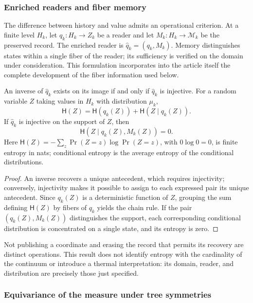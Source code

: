 \subsubsection{Enriched readers and fiber memory}
\label{sec:ch-memoria-fibra}

The difference between history and value admits an operational criterion. At a
finite level \(H_k\), let \(q_k:H_k\to Z_k\) be a reader and let
\(M_k:H_k\to\mathcal M_k\) be the preserved record. The enriched reader
is \(\widehat q_k=(q_k,M_k)\). Memory distinguishes states within a single
fiber of the reader; its sufficiency is verified on the domain under consideration.
This formulation incorporates into the article itself the complete development of the
fiber information used below.

\begin{proposition}
\label{prop:ch-recuperabilidad-fibra}
An inverse of \(\widehat q_k\) exists on its image if and only if
\(\widehat q_k\) is injective. For a random variable \(Z\) taking
values in \(H_k\) with distribution \(\mu_k\),
\[
 \mathsf H(Z)=\mathsf H(q_k(Z))+\mathsf H(Z\mid q_k(Z)).
\]
If \(\widehat q_k\) is injective on the support of \(Z\), then
\[
 \mathsf H(Z\mid q_k(Z),M_k(Z))=0.
\]
Here \(\mathsf H(Z)=-\sum_z\Pr(Z=z)\log\Pr(Z=z)\), with
\(0\log0=0\), is finite entropy in nats; conditional entropy is
the average entropy of the conditional distributions.
\end{proposition}

\begin{proof}
An inverse recovers a unique antecedent, which requires injectivity;
conversely, injectivity makes it possible to assign to each expressed pair its unique
antecedent. Since \(q_k(Z)\) is a deterministic function of \(Z\),
grouping the sum defining \(\mathsf H(Z)\) by fibers of \(q_k\) yields the
chain rule. If the pair \((q_k(Z),M_k(Z))\) distinguishes the support,
each corresponding conditional distribution is concentrated on a single
state, and its entropy is zero.
\end{proof}

Not publishing a coordinate and erasing the record that permits its recovery are
distinct operations. This result does not identify entropy with the cardinality
of the continuum or introduce a thermal interpretation: its domain, reader, and
distribution are precisely those just specified.

\subsubsection{Equivariance of the measure under tree symmetries}
\label{sec:ch-naturalidad-medida}

